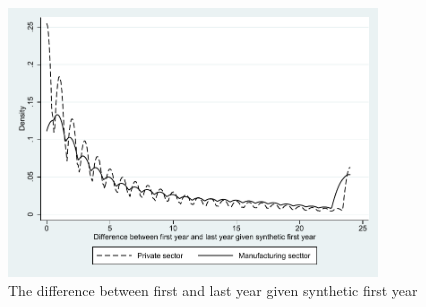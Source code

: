 \begin{figure} [H]
\centering
\caption{The difference between first and last year given synthetic first year} \label{SyntheticFirstYear}
\includegraphics[height=2.8in, width=.7\linewidth]{graphs/The_difference_between_first_and_last_year_given_synthetic_first_year_bw.pdf} 
\begin{minipage}{0.85\textwidth}
\end{minipage}
\end{figure}
